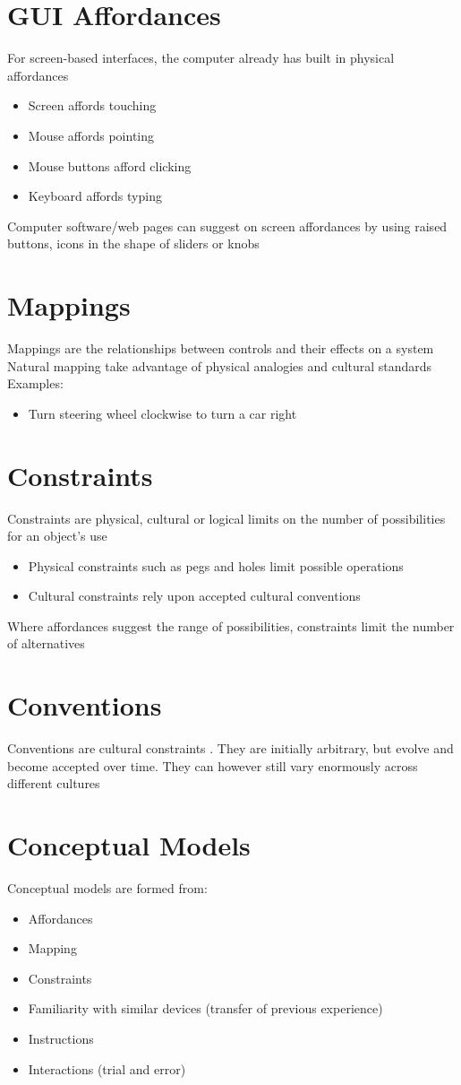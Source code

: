 \documentclass{article}[18pt]
\begin{document}
\section{GUI Affordances}
For screen-based interfaces, the computer already has built in physical affordances
\begin{itemize}
	\item Screen affords touching
	\item Mouse affords pointing
	\item Mouse buttons afford clicking
	\item Keyboard affords typing
\end{itemize}
Computer software/web pages can suggest on screen affordances by using raised buttons, icons in the shape of sliders or knobs
\section{Mappings}
Mappings are the relationships between controls and their effects on a system\\
Natural mapping take advantage of physical analogies and cultural standards\\
Examples:
\begin{itemize}
	\item Turn steering wheel clockwise to turn a car right
\end{itemize}
\section{Constraints}
Constraints are physical, cultural or logical limits on the number of possibilities for an object's use
\begin{itemize}
	\item Physical constraints such as pegs and holes limit possible operations
	\item Cultural constraints rely upon accepted cultural conventions
\end{itemize}
Where affordances suggest the range of possibilities, constraints limit the number of alternatives
\section{Conventions}
Conventions are cultural constraints . They are initially arbitrary, but evolve and become accepted over time. They can however still vary enormously across different cultures
\section{Conceptual Models}
Conceptual models are formed from:
\begin{itemize}
	\item Affordances
	\item Mapping
	\item Constraints
	\item Familiarity with similar devices (transfer of previous experience)
	\item Instructions
	\item Interactions (trial and error)
\end{itemize}
\end{document}
